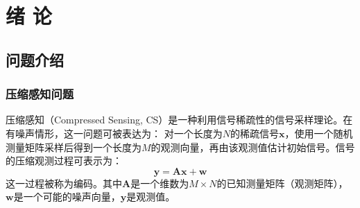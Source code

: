 \documentclass[AutoFakeBold]{LZUThesis}
\begin{document}


\mainmatter

\chapter{\texorpdfstring{绪 \quad 论}{绪论}}

\label{1}

\section{问题介绍}

\subsection{压缩感知问题}

压缩感知（Compressed Sensing, CS）是一种利用信号稀疏性的信号采样理论。在有噪声情形，这一问题可被表达为：
对一个长度为$N$的稀疏信号$\mathbf{x}$，使用一个随机测量矩阵采样后得到一个长度为$M$的观测向量，再由该观测值估计初始信号。信号的压缩观测过程可表示为：
\begin{equation}
    \mathbf{y} = \mathbf{Ax} + \mathbf{w}
\end{equation}
这一过程被称为编码。其中$\mathbf{A}$是一个维数为$M \times N$的已知测量矩阵（观测矩阵），$\mathbf{w}$是一个可能的噪声向量，$\mathbf{y}$是观测值。
\end{document}
